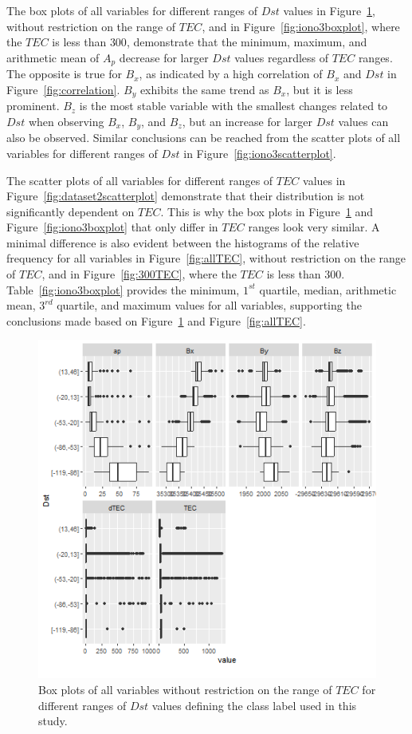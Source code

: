 \documentclass[preprint,12pt]{elsarticle}
\begin{document}
The box plots of all variables for different ranges of $Dst$ values in Figure~\ref{fig:dataset2boxplot}, without restriction on the range of $TEC$, and in Figure~\ref{fig:iono3boxplot}, where the $TEC$ is less than $300$, demonstrate that the minimum, maximum, and arithmetic mean of $A_{p}$ decrease for larger $Dst$ values regardless of $TEC$ ranges. The opposite is true for $B_{x}$, as indicated by a high correlation of $B_{x}$ and $Dst$ in Figure~\ref{fig:correlation}. $B_{y}$ exhibits the same trend as $B_{x}$, but it is less prominent. $B_{z}$ is the most stable variable with the smallest changes related to $Dst$ when observing $B_{x}$, $B_{y}$, and $B_{z}$, but an increase for larger $Dst$ values can also be observed. Similar conclusions can be reached from the scatter plots of all variables for different ranges of $Dst$ in Figure~\ref{fig:iono3scatterplot}. 

The scatter plots of all variables for different ranges of $TEC$ values in Figure~\ref{fig:dataset2scatterplot} demonstrate that their distribution is not significantly dependent on $TEC$. This is why the box plots in Figure~\ref{fig:dataset2boxplot} and Figure~\ref{fig:iono3boxplot} that only differ in $TEC$ ranges look very similar. A minimal difference is also evident between the histograms of the relative frequency for all variables in Figure~\ref{fig:allTEC}, without restriction on the range of $TEC$, and in Figure~\ref{fig:300TEC}, where the $TEC$ is less than $300$. Table~\ref{fig:iono3boxplot} provides the minimum, $1^{st}$ quartile, median, arithmetic mean, $3^{rd}$ quartile, and maximum values for all variables, supporting the conclusions made based on Figure~\ref{fig:dataset2boxplot} and Figure~\ref{fig:allTEC}.

\begin{figure}
    \centering
    \includegraphics[width=0.9\linewidth]{dataset2boxplot.png}
    \caption{Box plots of all variables without restriction on the range of $TEC$ for different ranges of $Dst$ values defining the class label used in this study.}
    \label{fig:dataset2boxplot}
\end{figure}
\end{document}
